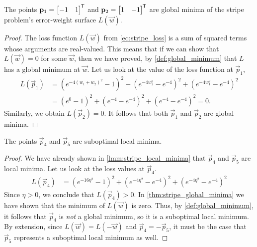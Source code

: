 \begin{theorem}
    \label{thm:stripe_global_minima}
    The points $\mathbf{p}_1=\begin{bmatrix}
        -1 & 1
    \end{bmatrix}^{\mkern-1.5mu\mathsf{T}}$ and $\mathbf{p}_2=\begin{bmatrix}
        1 & -1
    \end{bmatrix}^{\mkern-1.5mu\mathsf{T}}$ are global minima of the stripe problem's error-weight surface $L(\vec{w})$.
\end{theorem}
\begin{proof}
    The loss function $L(\vec{w})$ from \ref{eq:stripe_loss} is a sum of squared terms whose arguments are real-valued.
    This means that if we can show that $L(\vec{w})=0$ for some $\vec{w}$, then we have proved, by \ref{def:global_minimum} that $L$ has a global minimum at $\vec{w}$.
    Let us look at the value of the loss function at $\vec{p}_1$,
    \begin{align*}
        L(\vec{p}_1)
        &=\left(e^{-4(w_1 + w_2)^2} - 1\right)^2
        + \left(e^{-4w_2^2} - e^{-4}\right)^2
        + \left(e^{-4w_1^2} - e^{-4}\right)^2 \\
        &=\left(e^{0} - 1\right)^2
        + \left(e^{-4} - e^{-4}\right)^2
        + \left(e^{-4} - e^{-4}\right)^2 = 0.
    \end{align*}
    Similarly, we obtain $L(\vec{p}_2)=0$. It follows that both $\vec{p}_1$ and $\vec{p}_2$ are global minima.
\end{proof}
\begin{corollary}
    \label{col:stripe_suboptimal_local_minima}
    The points $\vec{p}_4$ and $\vec{p}_5$ are suboptimal local minima.
\end{corollary}
\begin{proof}
    We have already shown in \ref{lmm:stripe_local_minima} that $\vec{p}_4$ and $\vec{p}_5$ are local minima. 
    Let us look at the loss values at $\vec{p}_4$.
    \begin{align*}
        L(\vec{p}_4)
        &=\left(e^{-16\eta^2} - 1\right)^2
        + \left(e^{-4\eta^2} - e^{-4}\right)^2
        + \left(e^{-4\eta^2} - e^{-4}\right)^2
    \end{align*}
    Since $\eta > 0$, we conclude that $L(\vec{p}_4)>0$. 
    In \ref{thm:stripe_global_minima} we have shown that the minimum of $L(\vec{w})$ is zero.
    Thus, by \ref{def:global_minimum}, it follows that $\vec{p}_4$ is \textit{not} a global minimum, so it is a suboptimal local minimum.
    By extension, since $L(\vec{w})=L(-\vec{w})$ and $\vec{p}_4=-\vec{p}_5$, it must be the case that $\vec{p}_5$ represents a suboptimal local minimum as well.
\end{proof}

